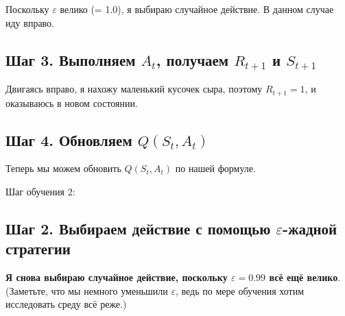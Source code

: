 \documentclass[11pt,a4paper]{article}
\begin{document}
Поскольку \(\varepsilon\) велико (= 1.0), я выбираю случайное действие. В данном случае иду вправо.


\subsection{\texorpdfstring{Шаг 3. Выполняем \(A_t\), получаем \(R_{t+1}\) и \(S_{t+1}\)}{Шаг 3. Выполняем At, получаем R(t+1) и S(t+1)}}\label{step-3-perform-action-at-get-rt1-and-st1}

Двигаясь вправо, я нахожу маленький кусочек сыра, поэтому \(R_{t+1}=1\), и оказываюсь в новом состоянии.


\subsection{\texorpdfstring{Шаг 4. Обновляем \(Q(S_t,A_t)\)}{Шаг 4. Обновляем Q(St,At)}}\label{step-4-update-qst-at-1}

Теперь мы можем обновить \(Q(S_t,A_t)\) по нашей формуле.



Шаг обучения 2:

\subsection{\texorpdfstring{Шаг 2. Выбираем действие с помощью \(\varepsilon\)-жадной стратегии}{Шаг 2. Выбираем действие с помощью epsilon-жадной стратегии}}\label{step-2-choose-an-action-using-the-epsilon-greedy-strategy-2}

\textbf{Я снова выбираю случайное действие, поскольку \(\varepsilon=0.99\) всё ещё велико}. (Заметьте, что мы немного уменьшили \(\varepsilon\), ведь по мере обучения хотим исследовать среду всё реже.)
\end{document}
